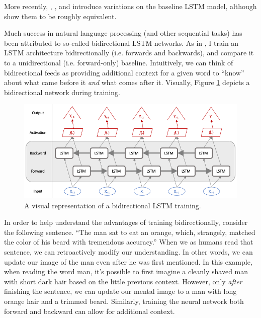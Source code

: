 \documentclass{article}
\begin{document}
	More recently, \citet{gers2000recurrent}, \citet{chung2014empirical}, and \citet{yao2015depth} introduce variations on the baseline \citet{hochreiter1997long} LSTM model, although \citet{greff2016lstm} show them to be roughly equivalent. 
	
	Much success in natural language processing (and other sequential tasks) has been attributed to so-called bidirectional LSTM networks. As in \citet{wang2015unified}, I train an LSTM architecture bidirectionally (i.e. forwards and backwards), and compare it to a unidirectional (i.e. forward-only) baseline. Intuitively, we can think of bidirectional feeds as providing additional context for a given word to ``know'' about what came before it \textit{and} what comes after it. Visually, Figure \ref{fig:bidirectional} depicts a bidirectional network during training. 
	 
	 \begin{figure}[H]
	 	\includegraphics[width=\textwidth]{figures/images/bidirectional-net.png}
	 	\caption{A visual representation of a bidirectional LSTM training.}
	 	\label{fig:bidirectional}
	 \end{figure}
	
	In order to help understand the advantages of training bidirectionally, consider the following sentence. ``The man sat to eat an orange, which, strangely, matched the color of his beard with tremendous accuracy.'' When we as humans read that sentence, we can retroactively modify our understanding. In other words, we can update our image of the man even after he was first mentioned. In this example, when reading the word man, it's possible to first imagine a cleanly shaved man with short dark hair based on the little previous context. However, only \textit{after} finishing the sentence, we can update our mental image to a man with long orange hair and a trimmed beard. Similarly, training the neural network both forward and backward can allow for additional context. 
	
\end{document}
